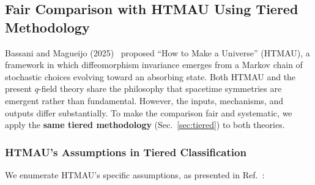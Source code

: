 \documentclass[aps,prd,twocolumn,showpacs,superscriptaddress,preprintnumbers]{revtex4-2}
\begin{document}
\subsection{Fair Comparison with HTMAU Using Tiered Methodology}
\label{sec:htmau_comparison}

Bassani and Magueijo (2025)~\cite{Bassani:2025htma} proposed ``How to Make a Universe'' (HTMAU), a framework in which diffeomorphism invariance emerges from a Markov chain of stochastic choices evolving toward an absorbing state.
Both HTMAU and the present $q$-field theory share the philosophy that spacetime symmetries are emergent rather than fundamental.
However, the inputs, mechanisms, and outputs differ substantially.
To make the comparison fair and systematic, we apply the \textbf{same tiered methodology} (Sec.~\ref{sec:tiered}) to both theories.

\subsubsection{HTMAU's Assumptions in Tiered Classification}

We enumerate HTMAU's specific assumptions, as presented in Ref.~\cite{Bassani:2025htma}:
\end{document}
